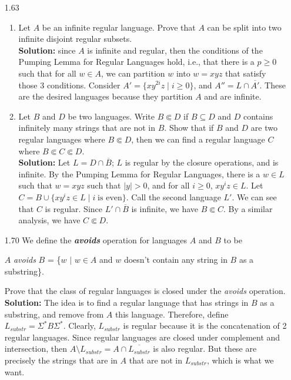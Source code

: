 \begin{enumerate}
\item[1.63]
\begin{enumerate}
\item Let $A$ be an infinite regular language. Prove that $A$ can be split into two infinite disjoint regular subsets.
\\
\textbf{Solution:} since $A$ is infinite and regular, then the conditions of the Pumping Lemma for Regular Languages hold, i.e., that there is a $p \ge 0$ such that for all $w \in A$, we can partition $w$ into $w = xyz$ that satisfy those 3 conditions. Consider $A' = \{xy^{2i}z\;\vert\;i \ge 0\}$, and $A'' = L \cap \overline{A'}$. These are the desired languages because they partition $A$ and are infinite. 

\item Let $B$ and $D$ be two languages. Write $B \Subset D$ if $B \subseteq D$ and $D$ contains infinitely many strings that are not in $B$. Show that if $B$ and $D$ are two regular languages where $B \Subset D$, then we can find a regular language $C$ where $B \Subset C \Subset D$.
\\
\textbf{Solution:} Let $L = D \cap \overline{B}$; $L$ is regular by the closure operations, and is infinite. By the Pumping Lemma for Regular Languages, there is a $w \in L$ such that $w = xyz$ such that $|y| > 0$, and for all $i \ge 0$, $xy^i z \in L$. Let $C = B \cup \{xy^i z \in L\;\vert\;i\;\text{is even}\}$. Call the second language $L'$. We can see that $C$ is regular. Since $L' \cap \overline{B}$ is infinite, we have $B \Subset C$. By a similar analysis, we have $C \Subset D$.
\end{enumerate}

\item[1.70]We define the \textbf{\emph{avoids}} operation for languages $A$ and $B$ to be
\begin{center}
$A$ \emph{avoids} $B$ = \{$w$ $|$ $w \in A$ and $w$ doesn't contain any string in $B$ as a substring\}.
\end{center}
Prove that the class of regular languages is closed under the \emph{avoids} operation.
\\
\textbf{Solution:} The idea is to find a regular language that has strings in $B$ as a substring, and remove from $A$ this language. Therefore, define $L_{substr} = \Sigma^*B\Sigma^*$. Clearly, $L_{substr}$ is regular because it is the concatenation of 2 regular languages. Since regular languages are closed under complement and intersection, then $A \setminus L_{substr} = A \cap \overline{L_{substr}}$ is also regular. But these are precisely the strings that are in $A$ that are not in $L_{substr}$, which is what we want.


\end{enumerate}
